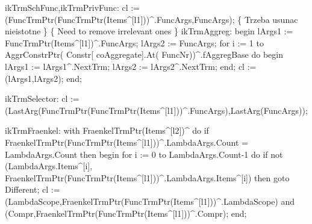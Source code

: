                   ikTrmSchFunc,ikTrmPrivFunc:
                     cl := (FuncTrmPtr(FuncTrmPtr(Items^[l1]))^.FuncArgs,FuncArgs);
                  \{ Trzeba usunac nieistotne \}
                  \{ Need to remove irrelevant ones \}
                  ikTrmAggreg:
                     begin
                        lArgs1 := FuncTrmPtr(Items^[l1])^.FuncArgs;
                        lArgs2 := FuncArgs;
                        for i := 1 to AggrConstrPtr( Constr[ coAggregate].At( FuncNr))^.fAggregBase do
                        begin
                           lArgs1 := lArgs1^.NextTrm;
                           lArgs2 := lArgs2^.NextTrm;
                        end;
                        cl := (lArgs1,lArgs2);
                     end;

                  ikTrmSelector:
                     cl := (LastArg(FuncTrmPtr(FuncTrmPtr(Items^[l1]))^.FuncArgs),LastArg(FuncArgs));

                  ikTrmFraenkel:
                     with FraenkelTrmPtr(Items^[l2])^ do
                     if FraenkelTrmPtr(FuncTrmPtr(Items^[l1]))^.LambdaArgs.Count = LambdaArgs.Count then
                     begin
                        for i := 0 to LambdaArgs.Count-1 do
                           if not (LambdaArgs.Items^[i],
                                         FraenkelTrmPtr(FuncTrmPtr(Items^[l1]))^.LambdaArgs.Items^[i]) then
                              goto Different;
                        cl :=  (LambdaScope,FraenkelTrmPtr(FuncTrmPtr(Items^[l1]))^.LambdaScope) and
                           (Compr,FraenkelTrmPtr(FuncTrmPtr(Items^[l1]))^.Compr);
                     end;
                  

